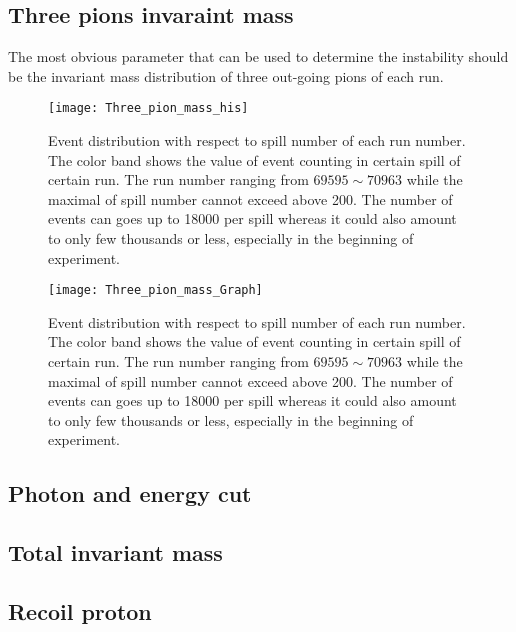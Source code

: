 \subsection{Three pions invaraint mass}
The most obvious parameter that can be used to determine the instability should be the invariant mass distribution of three out-going pions of each run. 

\begin{figure*}[!t]
	\centering
	\texttt{[image: Three\_pion\_mass\_his]}
	\caption{Event distribution with respect to spill number of each run number. The color band shows the value of event counting in certain spill of certain run. The run number ranging from $69595 \sim 70963$ while the maximal of spill number cannot exceed above 200. The number of events can goes up to 18000 per spill whereas it could also amount to only few thousands or less, especially in the beginning of experiment. }
	\label{fig:Three_pion_mass_his}
\end{figure*}


\begin{figure*}[!t]
	\centering
	\texttt{[image: Three\_pion\_mass\_Graph]}
	\caption{Event distribution with respect to spill number of each run number. The color band shows the value of event counting in certain spill of certain run. The run number ranging from $69595 \sim 70963$ while the maximal of spill number cannot exceed above 200. The number of events can goes up to 18000 per spill whereas it could also amount to only few thousands or less, especially in the beginning of experiment. }
	\label{fig:Three_pion_mass_Graph}
\end{figure*}
\subsection{Photon and energy cut}
\subsection{Total invariant mass}
\subsection{Recoil proton}


\clearpage